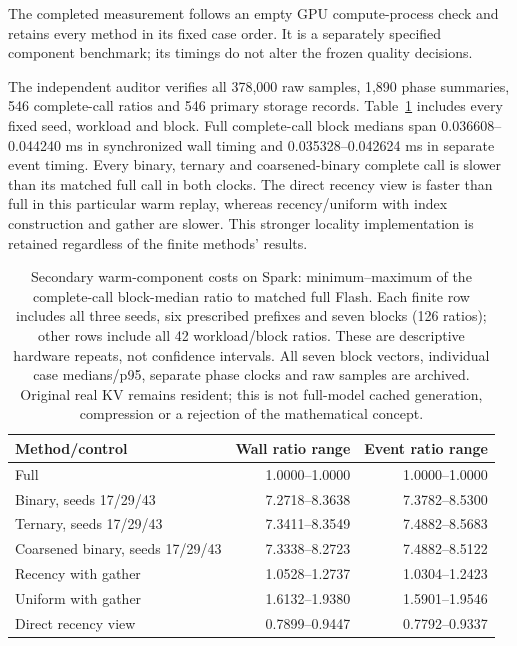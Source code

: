 \documentclass[11pt]{article}
\begin{document}
The completed measurement follows an empty GPU compute-process check and
retains every method in its fixed case order. It is a separately specified
component benchmark; its timings do not alter the frozen quality decisions.


The independent auditor verifies all 378,000 raw samples, 1,890 phase
summaries, 546 complete-call ratios and 546 primary storage records.
Table~\ref{tab:component-cost-ranges} includes every fixed seed, workload
and block. Full complete-call block medians span
0.036608--0.044240 ms in synchronized wall timing and
0.035328--0.042624 ms in separate event timing. Every binary, ternary and
coarsened-binary complete call is slower than its matched full call in
both clocks. The direct recency view is faster than full in this particular
warm replay, whereas recency/uniform with index construction and gather
are slower. This stronger locality implementation is retained regardless
of the finite methods' results.



\begin{table}[htbp]
\centering\small
\begin{tabular}{lrr}
\toprule
Method/control & Wall ratio range & Event ratio range\\
\midrule
Full & 1.0000--1.0000 & 1.0000--1.0000 \\
Binary, seeds 17/29/43 & 7.2718--8.3638 & 7.3782--8.5300 \\
Ternary, seeds 17/29/43 & 7.3411--8.3549 & 7.4882--8.5683 \\
Coarsened binary, seeds 17/29/43 & 7.3338--8.2723 & 7.4882--8.5122 \\
Recency with gather & 1.0528--1.2737 & 1.0304--1.2423 \\
Uniform with gather & 1.6132--1.9380 & 1.5901--1.9546 \\
Direct recency view & 0.7899--0.9447 & 0.7792--0.9337 \\
\bottomrule
\end{tabular}
\caption{Secondary warm-component costs on Spark: minimum--maximum of the
complete-call block-median ratio to matched full Flash. Each finite row
includes all three seeds, six prescribed prefixes and seven blocks (126
ratios); other rows include all 42 workload/block ratios. These are
descriptive hardware repeats, not confidence intervals. All seven block
vectors, individual case medians/p95, separate phase clocks and raw samples
are archived. Original real KV remains resident; this is not full-model
cached generation, compression or a rejection of the mathematical concept.}
\label{tab:component-cost-ranges}
\end{table}
\end{document}
